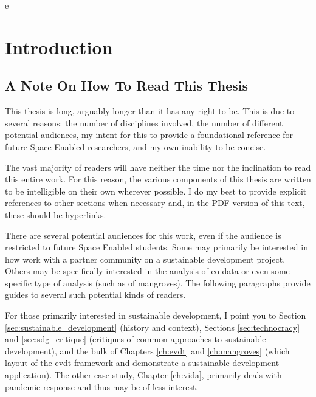 e%
\chapter{Introduction} \label{ch:intro}

\section{A Note On How To Read This Thesis} \label{sec:audiences}

This thesis is long, arguably longer than it has any right to be. This is due to several reasons: the number of disciplines involved, the number of different potential audiences, my intent for this to provide a foundational reference for future Space Enabled researchers, and my own inability to be concise. 

The vast majority of readers will have neither the time nor the inclination to read this entire work. For this reason, the various components of this thesis are written to be intelligible on their own wherever possible. I do my best to provide explicit references to other sections when necessary and, in the PDF version of this text, these should be hyperlinks. 

There are several potential audiences for this work, even if the audience is restricted to future Space Enabled students. Some may primarily be interested in how work with a partner community on a sustainable development project. Others may be specifically interested in the analysis of \ac{eo} data or even some specific type of analysis (such as of mangroves). The following paragraphs provide guides to several such potential kinds of readers. 

For those primarily interested in sustainable development, I point you to Section \ref{sec:sustainable_development} (history and context), Sections \ref{sec:technocracy} and \ref{sec:sdg_critique} (critiques of common approaches to sustainable development), and the bulk of Chapters \ref{ch:evdt} and \ref{ch:mangroves} (which layout of the \ac{evdt} framework and demonstrate a sustainable development application). The other case study, Chapter \ref{ch:vida}, primarily deals with pandemic response and thus may be of less interest.

